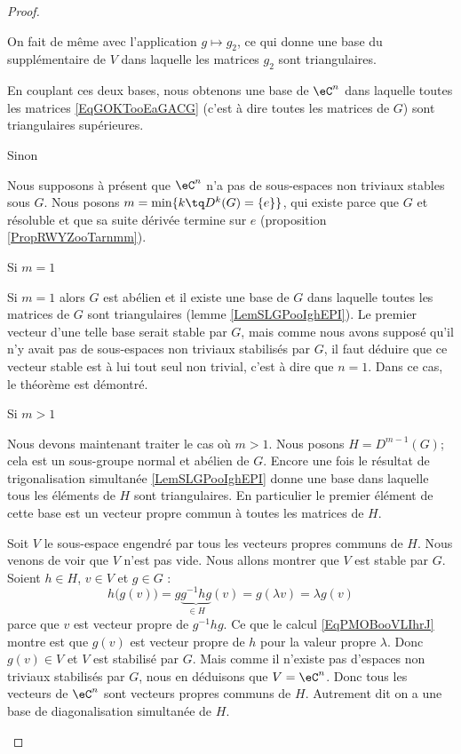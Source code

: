 \begin{proof}
\begin{subproof}
    On fait de même avec l'application \( g\mapsto g_2\), ce qui donne une base du supplémentaire de \( V\) dans laquelle les matrices \( g_2\) sont triangulaires. 

    En couplant ces deux bases, nous obtenons une base de \( \eC^n\) dans laquelle toutes les matrices \eqref{EqGOKTooEaGACG} (c'est à dire toutes les matrices de \( G\)) sont triangulaires supérieures.

    \item[Sinon]

    Nous supposons à présent que \( \eC^n\) n'a pas de sous-espaces non triviaux stables sous \( G\). Nous posons \( m=\min\{ k\tq D^k(G)=\{ e \} \}\), qui existe parce que \( G\) et résoluble et que sa suite dérivée termine sur \( {e}\) (proposition \ref{PropRWYZooTarnmm}).

\item[Si \( m=1\)]

    Si \( m=1\) alors \( G\) est abélien et il existe une base de \( G\) dans laquelle toutes les matrices de \( G\) sont triangulaires (lemme \ref{LemSLGPooIghEPI}). Le premier vecteur d'une telle base serait stable par \( G\), mais comme nous avons supposé qu'il n'y avait pas de sous-espaces non triviaux stabilisés par \( G\), il faut déduire que ce vecteur stable est à lui tout seul non trivial, c'est à dire que \( n=1\). Dans ce cas, le théorème est démontré.

\item[Si \( m>1\)]

    Nous devons maintenant traiter le cas où \( m>1\). Nous posons \( H=D^{m-1}(G)\); cela est un sous-groupe normal et abélien de \( G\). Encore une fois le résultat de trigonalisation simultanée \ref{LemSLGPooIghEPI} donne une base dans laquelle tous les éléments de \( H\) sont triangulaires. En particulier le premier élément de cette base est un vecteur propre commun à toutes les matrices de \( H\).

    Soit \( V\) le sous-espace engendré par tous les vecteurs propres communs de \( H\). Nous venons de voir que \( V\) n'est pas vide. Nous allons montrer que \( V\) est stable par \( G\). Soient \( h\in H\), \( v\in V\) et \( g\in G\) :
    \begin{equation}    \label{EqPMOBooVLIhrJ}
        h\big( g(v) \big)=g\underbrace{g^{-1}hg}_{\in H}(v)=g(\lambda v)=\lambda g(v)
    \end{equation}
    parce que \( v\) est vecteur propre de \( g^{-1} hg\). Ce que le calcul \eqref{EqPMOBooVLIhrJ} montre est que \( g(v)\) est vecteur propre de \( h\) pour la valeur propre \( \lambda\). Donc \( g(v)\in V\) et \( V\) est stabilisé par \( G\). Mais comme il n'existe pas d'espaces non triviaux stabilisés par \( G\), nous en déduisons que \( V=\eC^n\). Donc tous les vecteurs de \( \eC^n\) sont vecteurs propres communs de \( H\). Autrement dit on a une base de diagonalisation simultanée de \( H\).


\end{subproof}
\end{proof}
